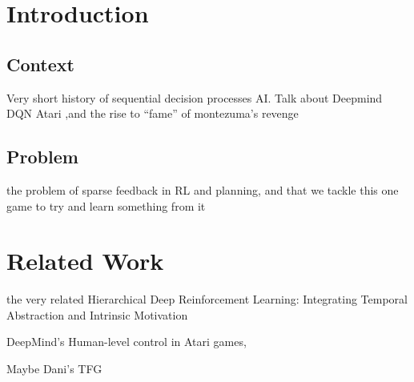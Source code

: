 \chapter{Introduction}
  \section{Context}
  Very short history of sequential decision processes AI. Talk about Deepmind DQN Atari ,and the rise to ``fame'' of montezuma's revenge
  \section{Problem}
   the problem of sparse feedback in RL and planning, and that we tackle this one game  to try and learn something from it
  

\chapter{Related Work}
  the very related Hierarchical Deep Reinforcement Learning: Integrating Temporal Abstraction and Intrinsic Motivation

  DeepMind's Human-level control in Atari games, 

  Maybe Dani's TFG
